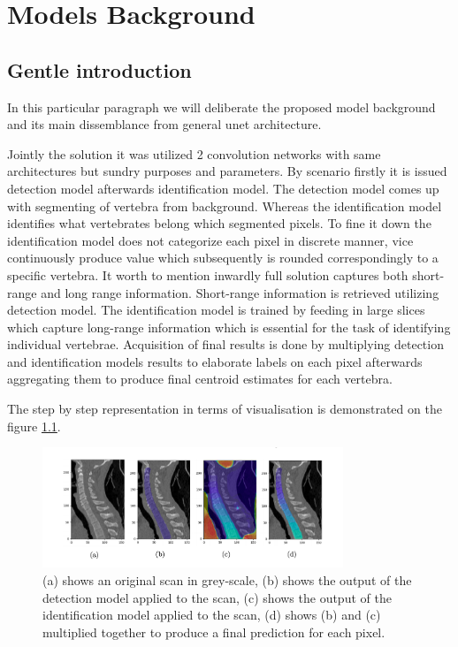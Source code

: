 \chapter{Models Background}
\label{ch:model_background}

\section{Gentle introduction}
In this particular paragraph we will deliberate the proposed model background and its main dissemblance from general unet architecture.

Jointly the solution it was utilized 2 convolution networks with same architectures but sundry purposes and parameters. By scenario firstly it is issued detection model afterwards identification model. The detection model comes up with segmenting of vertebra from background. Whereas the identification model identifies what vertebrates belong which segmented pixels. To fine it down the identification model does not categorize each pixel in discrete manner, vice continuously produce value which subsequently is rounded correspondingly to a specific vertebra. It worth to mention inwardly full solution captures both short-range and long range information. Short-range information is retrieved utilizing detection model. The identification model is trained by feeding in large slices which capture long-range information which is essential for the task of identifying individual vertebrae. Acquisition of final results is done by multiplying detection and identification models results to elaborate labels on each pixel afterwards aggregating them to produce final centroid estimates for each vertebra.

The step by step representation in terms of visualisation is demonstrated on the figure \ref{fig:detection_identification_steps}.

\begin{figure}[h]
    \centering \includegraphics[width=9cm]{images/detection_identification_steps.png}
    \caption {(a) shows an original scan in grey-scale, (b) shows the output of the detection model applied to the scan, (c) shows the output of the identification model applied to the scan, (d) shows (b) and (c) multiplied together to produce a final prediction for each pixel.}
    \label{fig:detection_identification_steps}
\end{figure}

